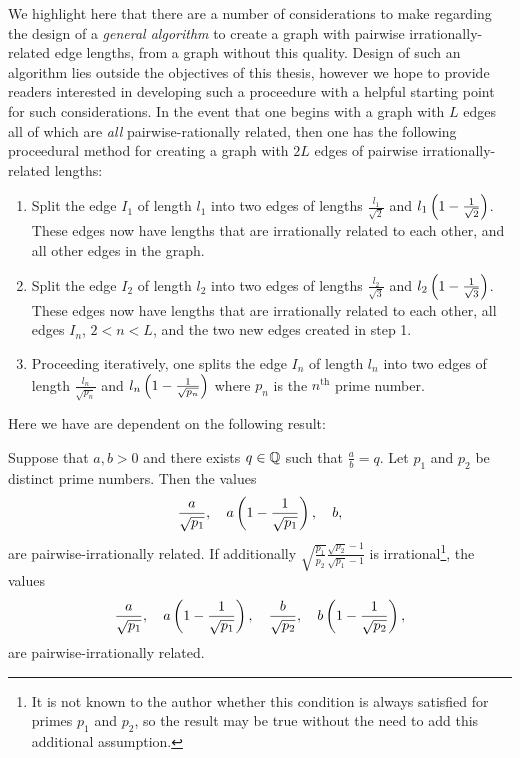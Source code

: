 We highlight here that there are a number of considerations to make regarding the design of a \emph{general algorithm} to create a graph with pairwise irrationally-related edge lengths, from a graph without this quality.
Design of such an algorithm lies outside the objectives of this thesis, however we hope to provide readers interested in developing such a proceedure with a helpful starting point for such considerations.
In the event that one begins with a graph with $L$ edges all of which are \emph{all} pairwise-rationally related, then one has the following proceedural method for creating a graph with $2L$ edges of pairwise irrationally-related lengths:
\begin{enumerate}
   \item Split the edge $I_1$ of length $l_1$ into two edges of lengths $\frac{l_1}{\sqrt{2}}$ and $l_1\left( 1 - \frac{1}{\sqrt{2}} \right)$.
   These edges now have lengths that are irrationally related to each other, and all other edges in the graph.
   \item Split the edge $I_2$ of length $l_2$ into two edges of lengths $\frac{l_2}{\sqrt{3}}$ and $l_2\left( 1-\frac{1}{\sqrt{3}} \right)$.
   These edges now have lengths that are irrationally related to each other, all edges $I_n$, $2<n<L$, and the two new edges created in step 1.
   \item Proceeding iteratively, one splits the edge $I_n$ of length $l_n$ into two edges of length $\frac{l_n}{\sqrt{p_n}}$ and $l_n\left( 1-\frac{1}{\sqrt{p_n}} \right)$ where $p_n$ is the $n^{\text{th}}$ prime number.   
\end{enumerate}
Here we have are dependent on the following result:
\begin{lemma} \label{lem:NumTheory-GraphSplitAlgorithm}
    Suppose that $a,b>0$ and there exists $q\in\mathbb{Q}$ such that $\frac{a}{b}=q$.
    Let $p_1$ and $p_2$ be distinct prime numbers. 
    Then the values
    \begin{align} \label{eq:NumTheory-PairsWithoutAssumption}
        \frac{a}{\sqrt{p_1}}, \quad
        a\left( 1-\frac{1}{\sqrt{p_1}} \right), \quad
        b,    
    \end{align}
    are pairwise-irrationally related.
    If additionally $\sqrt{\frac{p_1}{p_2}}\frac{\sqrt{p_2}-1}{\sqrt{p_1}-1}$ is irrational\footnote{It is not known to the author whether this condition is always satisfied for primes $p_1$ and $p_2$, so the result may be true without the need to add this additional assumption.}, the values
    \begin{align} \label{eq:NumTheory-PairsWithAssumption}
        \frac{a}{\sqrt{p_1}}, \quad
        a\left( 1-\frac{1}{\sqrt{p_1}} \right), \quad
        \frac{b}{\sqrt{p_2}}, \quad
        b\left( 1-\frac{1}{\sqrt{p_2}} \right),
    \end{align}
    are pairwise-irrationally related.
\end{lemma}
